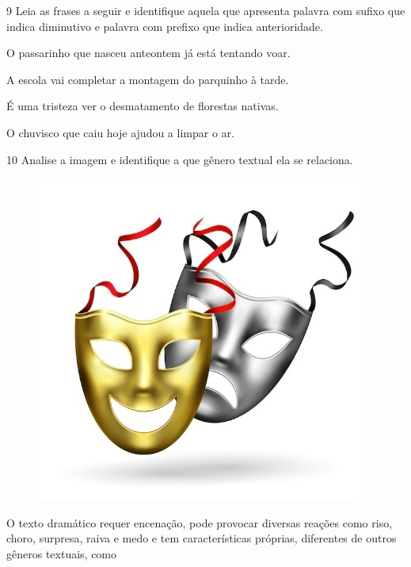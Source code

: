 \num{9} Leia as frases a seguir e identifique aquela que apresenta palavra
com sufixo que indica diminutivo e palavra com prefixo que indica
anterioridade.

\begin{escolha}
\item O passarinho que nasceu anteontem já está tentando voar.

\item A escola vai completar a montagem do parquinho à tarde.

\item É uma tristeza ver o desmatamento de florestas nativas.

\item O chuvisco que caiu hoje ajudou a limpar o ar.
\end{escolha}


\num{10} Analise a imagem e identifique a que gênero textual ela se relaciona.

\begin{figure}[htpb!]
\centering
\includegraphics[width=\textwidth]{./media/simulados/image1.jpeg}
\end{figure}

O texto dramático requer encenação, pode provocar diversas reações como
riso, choro, surpresa, raiva e medo e tem características próprias,
diferentes de outros gêneros textuais, como

